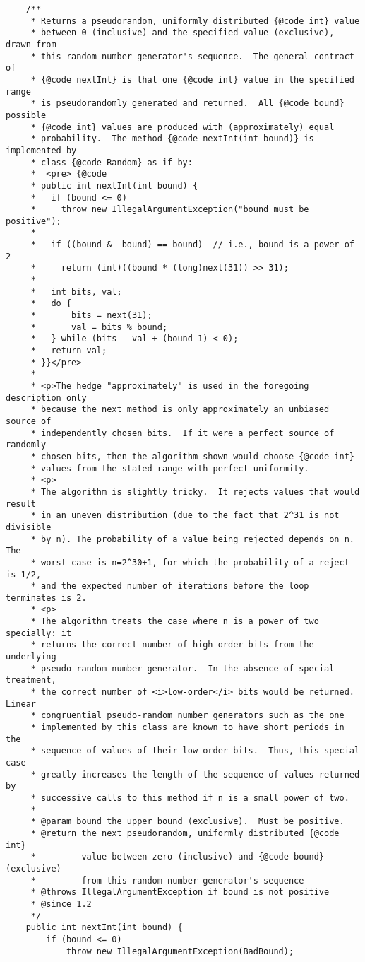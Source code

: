 \documentclass[12pt,a4paper,twoside,openright,titlepage,final]{article}
\begin{document}
\begin{verbatim}
    /**
     * Returns a pseudorandom, uniformly distributed {@code int} value
     * between 0 (inclusive) and the specified value (exclusive), drawn from
     * this random number generator's sequence.  The general contract of
     * {@code nextInt} is that one {@code int} value in the specified range
     * is pseudorandomly generated and returned.  All {@code bound} possible
     * {@code int} values are produced with (approximately) equal
     * probability.  The method {@code nextInt(int bound)} is implemented by
     * class {@code Random} as if by:
     *  <pre> {@code
     * public int nextInt(int bound) {
     *   if (bound <= 0)
     *     throw new IllegalArgumentException("bound must be positive");
     *
     *   if ((bound & -bound) == bound)  // i.e., bound is a power of 2
     *     return (int)((bound * (long)next(31)) >> 31);
     *
     *   int bits, val;
     *   do {
     *       bits = next(31);
     *       val = bits % bound;
     *   } while (bits - val + (bound-1) < 0);
     *   return val;
     * }}</pre>
     *
     * <p>The hedge "approximately" is used in the foregoing description only
     * because the next method is only approximately an unbiased source of
     * independently chosen bits.  If it were a perfect source of randomly
     * chosen bits, then the algorithm shown would choose {@code int}
     * values from the stated range with perfect uniformity.
     * <p>
     * The algorithm is slightly tricky.  It rejects values that would result
     * in an uneven distribution (due to the fact that 2^31 is not divisible
     * by n). The probability of a value being rejected depends on n.  The
     * worst case is n=2^30+1, for which the probability of a reject is 1/2,
     * and the expected number of iterations before the loop terminates is 2.
     * <p>
     * The algorithm treats the case where n is a power of two specially: it
     * returns the correct number of high-order bits from the underlying
     * pseudo-random number generator.  In the absence of special treatment,
     * the correct number of <i>low-order</i> bits would be returned.  Linear
     * congruential pseudo-random number generators such as the one
     * implemented by this class are known to have short periods in the
     * sequence of values of their low-order bits.  Thus, this special case
     * greatly increases the length of the sequence of values returned by
     * successive calls to this method if n is a small power of two.
     *
     * @param bound the upper bound (exclusive).  Must be positive.
     * @return the next pseudorandom, uniformly distributed {@code int}
     *         value between zero (inclusive) and {@code bound} (exclusive)
     *         from this random number generator's sequence
     * @throws IllegalArgumentException if bound is not positive
     * @since 1.2
     */
    public int nextInt(int bound) {
        if (bound <= 0)
            throw new IllegalArgumentException(BadBound);


\end{verbatim}
\end{document}
